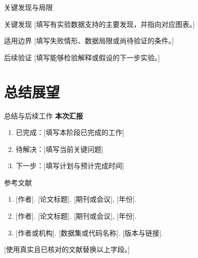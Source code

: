 \documentclass[aspectratio=169,11pt]{beamer}
\begin{document}
\begin{frame}{关键发现与局限}
  \begin{block}{关键发现}
    [填写有实验数据支持的主要发现，并指向对应图表。]
  \end{block}
  \begin{alertblock}{适用边界}
    [填写失败情形、数据局限或尚待验证的条件。]
  \end{alertblock}
  \begin{exampleblock}{后续验证}
    [填写能够检验解释或假设的下一步实验。]
  \end{exampleblock}
\end{frame}

\section{总结展望}
\begin{frame}{总结与后续工作}
  \textbf{本次汇报}\par
  [用一句话总结本次工作与主要证据。]
  \vspace{.35cm}
  \begin{enumerate}
    \setlength{\itemsep}{.8em}
    \item 已完成：[填写本阶段已完成的工作]
    \item 待解决：[填写当前关键问题]
    \item 下一步：[填写计划与预计完成时间]
  \end{enumerate}
\end{frame}

\begin{frame}{参考文献}
  \begin{enumerate}
    \setlength{\itemsep}{1em}
    \item {[作者]. [论文标题]. [期刊或会议], [年份].}
    \item {[作者]. [论文标题]. [期刊或会议], [年份].}
    \item {[作者或机构]. [数据集或代码名称]. [版本与链接].}
  \end{enumerate}
  \vspace{.45cm}
  {\small\color{muted}[使用真实且已核对的文献替换以上字段。]}
\end{frame}

\DrawThanksPage
\end{document}
